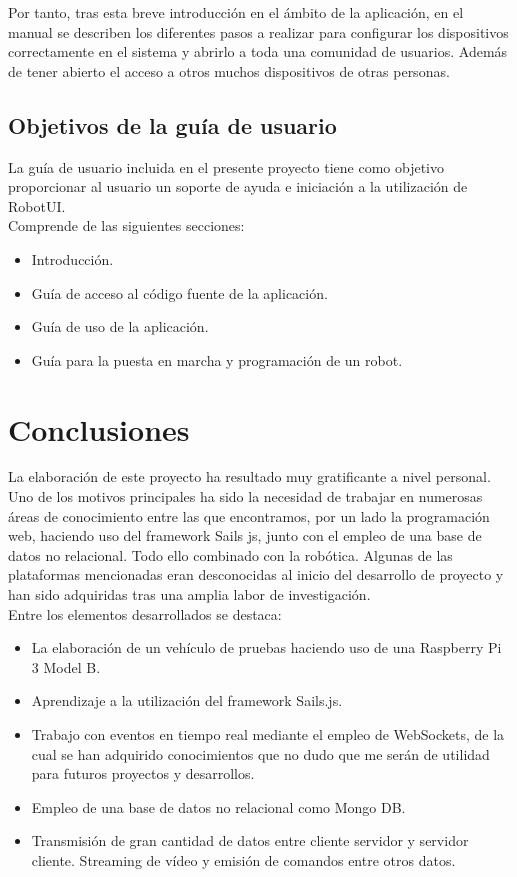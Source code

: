 \documentclass[a4paper,12pt]{article}
\begin{document}
Por tanto, tras esta breve introducción en el ámbito de la aplicación, en el manual se describen los diferentes pasos a realizar para configurar los dispositivos correctamente en el sistema
y abrirlo a toda una comunidad de usuarios. Además de tener abierto el acceso a otros muchos dispositivos de otras personas.\\


\subsection{ Objetivos de la guía de usuario }

La guía de usuario incluida en el presente proyecto tiene como objetivo proporcionar al usuario un soporte de ayuda e iniciación a la utilización de RobotUI.\\

Comprende de las siguientes secciones:\\

\begin{itemize}
 \item Introducción.
 \item Guía de acceso al código fuente de la aplicación.
 \item Guía de uso de la aplicación.
 \item Guía para la puesta en marcha y programación de un robot.
\end{itemize}


\section{Conclusiones}

La elaboración de este proyecto ha resultado muy gratificante a nivel personal. Uno de los motivos principales ha sido la necesidad de trabajar en numerosas áreas de conocimiento entre las que 
encontramos, por un lado la programación web, haciendo uso del framework Sails js, junto con el empleo de una base de datos no relacional. 
Todo ello combinado con la robótica. Algunas de las plataformas mencionadas eran desconocidas al inicio del desarrollo de proyecto y han sido adquiridas tras una amplia labor de investigación.\\

Entre los elementos desarrollados se destaca:

\begin{itemize}
 \item La elaboración de un vehículo de pruebas haciendo uso de una Raspberry Pi 3 Model B.
 \item Aprendizaje a la utilización del framework Sails.js.
 \item Trabajo con eventos en tiempo real mediante el empleo de WebSockets, de la cual se han adquirido conocimientos que no dudo que me serán de utilidad para futuros proyectos y desarrollos.
 \item Empleo de una base de datos no relacional como Mongo DB.
 \item Transmisión de gran cantidad de datos entre cliente servidor y servidor cliente. Streaming de vídeo y emisión de comandos entre otros datos.\\
\end{itemize}
\end{document}
